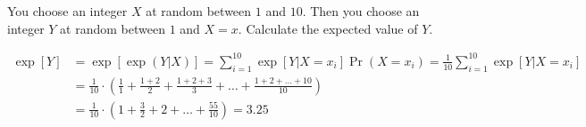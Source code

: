 You choose an integer $X$ at random between $1$ and $10$. Then you choose an integer $Y$ at random between $1$ and $X=x$. Calculate the expected value of $Y$. 
\begin{answer}
\begin{align*}
\exp[Y] 
  & = \exp[\exp(Y|X)]
    = \sum_{i=1}^{10} \exp[Y|X=x_i] \Pr(X=x_i)
    = \frac{1}{10} \sum_{i=1}^{10} \exp[Y|X=x_i]\\
  & = \frac{1}{10} \cdot \left(\frac{1}{1} 
  + \frac{1+2}{2} 
  + \frac{1+2+3}{3} 
  + \ldots
  + \frac{1+2+\ldots+10}{10}
  \right)\\
  & = \frac{1}{10} \cdot \left(1+\frac{3}{2}+2+\ldots+\frac{55}{10}\right)
    = 3.25
\end{align*}
\end{answer}